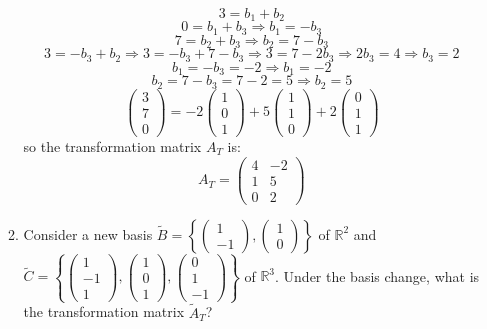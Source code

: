 \documentclass[a3paper,12pt]{extarticle} %
\begin{document}
\begin{enumerate}
\begin{enumerate}
\[        \]
        \[
            3 = b_1 + b_2 
        \]
        \[
            0 = b_1 + b_3 \Rightarrow b_1 = -b_3
        \]
        \[
            7 = b_2 + b_3 \Rightarrow b_2 = 7 - b_3
        \]  
        \[
            3 = -b_3 + b_2 \Rightarrow 3 = -b_3 + 7 - b_3 \Rightarrow 3 = 7 - 2b_3 \Rightarrow 2b_3 = 4 \Rightarrow b_3 = 2
        \]
        \[
            b_1 = -b_3 = -2 \Rightarrow b_1 = -2
        \]
        \[
            b_2 = 7 - b_3 = 7 - 2 = 5 \Rightarrow b_2 = 5
        \]
        \[
            \begin{pmatrix}
                3  \\
                7  \\
                0
            \end{pmatrix} =  -2 \begin{pmatrix} 1 \\ 0 \\ 1 \end{pmatrix} + 5 \begin{pmatrix} 1 \\ 1 \\ 0 \end{pmatrix} + 2 \begin{pmatrix} 0 \\ 1 \\ 1 \end{pmatrix}
        \]
        so the transformation matrix \( A_T \) is:
        \[
            A_T = \begin{pmatrix} 4 & -2 \\ 1 & 5 \\ 0 & 2 \end{pmatrix}
        \]
        \item Consider a new basis \(\tilde{B} = \left\{ \begin{pmatrix} 1 \\ -1 \end{pmatrix}, \begin{pmatrix} 1 \\ 0 \end{pmatrix} \right\}\) of \(\mathbb{R}^2\) and \(\tilde{C} = \left\{ \begin{pmatrix} 1 \\ -1 \\ 1 \end{pmatrix}, \begin{pmatrix} 1 \\ 0 \\ 1 \end{pmatrix}, \begin{pmatrix} 0 \\ 1 \\ -1 \end{pmatrix} \right\}\) of \(\mathbb{R}^3\). Under the basis change, what is the transformation matrix \(\tilde{A}_T\)?

\end{enumerate}
\end{enumerate}
\end{document}

